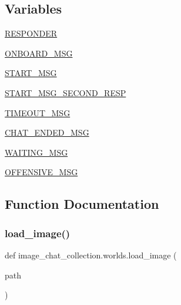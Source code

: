 \subsection*{Variables}
\begin{DoxyCompactItemize}
\item 
\hyperlink{namespaceimage__chat__collection_1_1worlds_a763fe48ded15da84c091ab4beed7bca1}{R\+E\+S\+P\+O\+N\+D\+ER}
\item 
\hyperlink{namespaceimage__chat__collection_1_1worlds_aede8d69e21371728ceb2f79115c0ad7f}{O\+N\+B\+O\+A\+R\+D\+\_\+\+M\+SG}
\item 
\hyperlink{namespaceimage__chat__collection_1_1worlds_a711cbe5dc79832b607bbf883952ab02a}{S\+T\+A\+R\+T\+\_\+\+M\+SG}
\item 
\hyperlink{namespaceimage__chat__collection_1_1worlds_a04b24a82ebebe85194792ec3f5fe7aed}{S\+T\+A\+R\+T\+\_\+\+M\+S\+G\+\_\+\+S\+E\+C\+O\+N\+D\+\_\+\+R\+E\+SP}
\item 
\hyperlink{namespaceimage__chat__collection_1_1worlds_a2ef726e0acc6f4e099deebfbf8f99765}{T\+I\+M\+E\+O\+U\+T\+\_\+\+M\+SG}
\item 
\hyperlink{namespaceimage__chat__collection_1_1worlds_a74ad76ba8a00e7d4f506e2547ad8203c}{C\+H\+A\+T\+\_\+\+E\+N\+D\+E\+D\+\_\+\+M\+SG}
\item 
\hyperlink{namespaceimage__chat__collection_1_1worlds_a0271dcce477941bc90537f54717ddfbe}{W\+A\+I\+T\+I\+N\+G\+\_\+\+M\+SG}
\item 
\hyperlink{namespaceimage__chat__collection_1_1worlds_a3bab44a548d70ed984c05e3ce9039da7}{O\+F\+F\+E\+N\+S\+I\+V\+E\+\_\+\+M\+SG}
\end{DoxyCompactItemize}


\subsection{Function Documentation}
\mbox{\label{namespaceimage__chat__collection_1_1worlds_aa028ae9a4f66d727036827410f5483ec}} 
\subsubsection{\texorpdfstring{load\+\_\+image()}{load\_image()}}
{\footnotesize\ttfamily def image\+\_\+chat\+\_\+collection.\+worlds.\+load\+\_\+image (\begin{DoxyParamCaption}\item[{}]{path }\end{DoxyParamCaption})}




